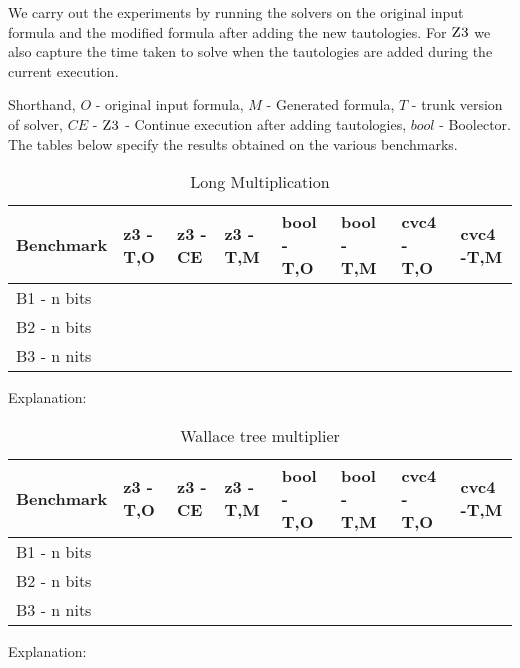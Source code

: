 We carry out the experiments by running the solvers on the original input formula and the modified formula after adding the new tautologies. For $\textsc{Z3}$ we also capture the time taken to solve when the tautologies are added during the current execution.

Shorthand, $O$ - original input formula, $M$ - Generated formula, $T$ - trunk version of solver, $CE$ - $\textsc{Z3}$ - Continue execution after adding tautologies, $bool$ - Boolector.
The tables below specify the results obtained on the various benchmarks. 

\begin{table}[]
\centering
\caption{Long Multiplication}
\label{my-label}
\begin{tabular}{|l|l|l|l|l|l|l|l|}
\hline
Benchmark   & z3 - T,O & z3 - CE & z3 - T,M & bool - T,O & bool - T,M & cvc4 - T,O & cvc4 -T,M \\ \hline
B1 - n bits &          &         &          &            &            &            &           \\ \hline
B2 - n bits &          &         &          &            &            &            &           \\ \hline
B3 - n nits &          &         &          &            &            &            &           \\ \hline
\end{tabular}
\end{table}

Explanation: 

\begin{table}[]
\centering
\caption{Wallace tree multiplier}
\label{my-label}
\begin{tabular}{|l|l|l|l|l|l|l|l|}
\hline
Benchmark   & z3 - T,O & z3 - CE & z3 - T,M & bool - T,O & bool - T,M & cvc4 - T,O & cvc4 -T,M \\ \hline
B1 - n bits &          &         &          &            &            &            &           \\ \hline
B2 - n bits &          &         &          &            &            &            &           \\ \hline
B3 - n nits &          &         &          &            &            &            &           \\ \hline
\end{tabular}
\end{table}

Explanation:

 
